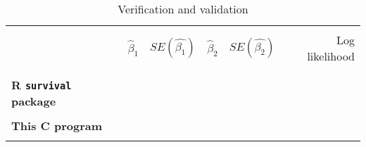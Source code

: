 \documentclass{article}
\begin{document}
\begin{table}[h!]
	\caption{Verification and validation}
	\centering
	\begin{tabular}{|l r r r r r|}
		\hline
		& & & & &\\
		& $\hat{\beta}_1$ & $SE(\hat{\beta_1})$ & $\hat{\beta}_2$ &
		$SE(\hat{\beta_2})$ & Log likelihood\\
		& & & & &\\
		\hline
		& & & & &\\
		\textbf{R \texttt{survival} package}&  &           & & &           \\
		& & & & &\\
		\textbf{This C program}      &         &           & & &       \\
		& & & & &\\
		\hline
	\end{tabular}
\end{table}
\end{document}
